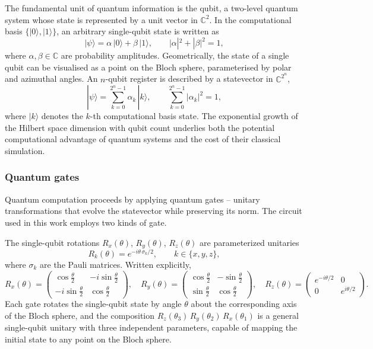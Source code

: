 \documentclass[11pt,a4paper]{article}
\begin{document}
The fundamental unit of quantum information is the qubit, a
two-level quantum system whose state is represented by a unit vector in
$\mathbb{C}^2$.  In the computational basis $\{|0\rangle, |1\rangle\}$,
an arbitrary single-qubit state is written as
\begin{equation}
  |\psi\rangle = \alpha\,|0\rangle + \beta\,|1\rangle, \qquad
  |\alpha|^2 + |\beta|^2 = 1,
\end{equation}
where $\alpha, \beta \in \mathbb{C}$ are probability amplitudes.
Geometrically, the state of a single qubit can be visualised as a point
on the Bloch sphere, parameterised by polar and azimuthal angles.  An
$n$-qubit register is described by a statevector in
$\mathbb{C}^{2^n}$,
\begin{equation}
  |\psi\rangle = \sum_{k=0}^{2^n - 1} \alpha_k\,|k\rangle, \qquad
  \sum_{k=0}^{2^n - 1} |\alpha_k|^2 = 1,
\end{equation}
where $|k\rangle$ denotes the $k$-th computational basis state.  The
exponential growth of the Hilbert space dimension with qubit count
underlies both the potential computational advantage of quantum systems
and the cost of their classical simulation.

\subsubsection{Quantum gates}

Quantum computation proceeds by applying quantum gates -- unitary transformations that evolve the statevector while preserving its norm. The circuit used in this work employs two kinds of gate.

The single-qubit rotations $R_x(\theta)$, $R_y(\theta)$, $R_z(\theta)$ are parameterized unitaries
\begin{equation}
  R_k(\theta) = e^{-i\theta\,\sigma_k/2}, \qquad k \in \{x,y,z\},
\end{equation}
where $\sigma_k$ are the Pauli matrices. Written explicitly,
\begin{equation}
  R_x(\theta) =
  \begin{pmatrix} \cos\tfrac{\theta}{2} & -i\sin\tfrac{\theta}{2} \\
  -i\sin\tfrac{\theta}{2} & \cos\tfrac{\theta}{2} \end{pmatrix},
\quad
  R_y(\theta) =
  \begin{pmatrix} \cos\tfrac{\theta}{2} & -\sin\tfrac{\theta}{2} \\
  \sin\tfrac{\theta}{2} & \cos\tfrac{\theta}{2} \end{pmatrix},
\quad
  R_z(\theta) =
  \begin{pmatrix} e^{-i\theta/2} & 0 \\
  0 & e^{i\theta/2} \end{pmatrix}.
\end{equation}
Each gate rotates the single-qubit state by angle $\theta$ about the corresponding axis of the Bloch sphere, and the composition $R_z(\theta_3)\,R_y(\theta_2)\,R_x(\theta_1)$ is a general single-qubit unitary with three independent parameters, capable of mapping the initial state to any point on the Bloch sphere.
\end{document}
